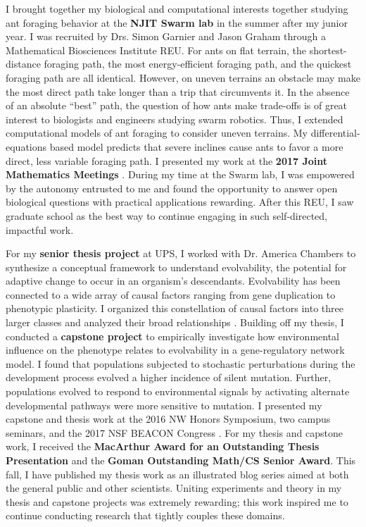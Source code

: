 I brought together my biological and computational interests together studying ant foraging behavior at the \textbf{NJIT Swarm lab} in the summer after my junior year.
I was recruited by Drs. Simon Garnier and Jason Graham through a Mathematical Biosciences Institute REU.
For ants on flat terrain, the shortest-distance foraging path, the most energy-efficient foraging path, and the quickest foraging path are all identical.
However, on uneven terrains an obstacle may make the most direct path take longer than a trip that circumvents it.
In the absence of an absolute ``best'' path, the question of how ants make trade-offs is of great interest to biologists and engineers studying swarm robotics.
Thus, I extended computational models of ant foraging to consider uneven terrains.
My differential-equations based model predicts that severe inclines cause ants to favor a more direct, less variable foraging path.
I presented my work at the \textbf{2017 Joint Mathematics Meetings} \cite{jmm}.
During my time at the Swarm lab, I was empowered by the autonomy entrusted to me and found the opportunity to answer open biological questions with practical applications rewarding.
After this REU, I saw graduate school as the best way to continue engaging in such self-directed, impactful work.

For my \textbf{senior thesis project} at UPS, I worked with Dr. America Chambers to synthesize a conceptual framework to understand evolvability, the potential for adaptive change to occur in an organism's descendants.
Evolvability has been connected to a wide array of causal factors ranging from gene duplication to phenotypic plasticity.
I organized this constellation of causal factors into three larger classes and analyzed their broad relationships \cite{thesis}.
Building off my thesis, I conducted a \textbf{capstone project} to empirically investigate how environmental influence on the phenotype relates to evolvability in a gene-regulatory network model.
I found that populations subjected to stochastic perturbations during the development process evolved a higher incidence of silent mutation.
Further, populations evolved to respond to environmental signals by activating alternate developmental pathways were more sensitive to mutation.
I presented my capstone and thesis work at the 2016 NW Honors Symposium, two campus seminars, and the 2017 NSF BEACON Congress \cite{beacon}.
For my thesis and capstone work, I received the \textbf{MacArthur Award for an Outstanding Thesis Presentation} and the \textbf{Goman Outstanding Math/CS Senior Award}.
This fall, I have published my thesis work as an illustrated blog series aimed at both the general public and other scientists.
Uniting experiments and theory in my thesis and capstone projects was extremely rewarding;
this work inspired me to continue conducting research that tightly couples these domains.
